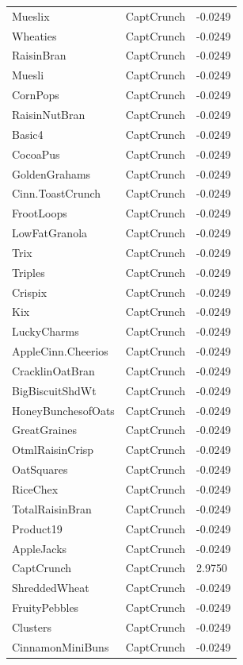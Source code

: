 \begin{table}[!htbp]
\begin{tabular}{lll}
\\
Mueslix & CaptCrunch & -0.0249
\\
Wheaties & CaptCrunch & -0.0249
\\
RaisinBran & CaptCrunch & -0.0249
\\
Muesli & CaptCrunch & -0.0249
\\
CornPops & CaptCrunch & -0.0249
\\
RaisinNutBran & CaptCrunch & -0.0249
\\
Basic4 & CaptCrunch & -0.0249
\\
CocoaPus & CaptCrunch & -0.0249
\\
GoldenGrahams & CaptCrunch & -0.0249
\\
Cinn.ToastCrunch & CaptCrunch & -0.0249
\\
FrootLoops & CaptCrunch & -0.0249
\\
LowFatGranola & CaptCrunch & -0.0249
\\
Trix & CaptCrunch & -0.0249
\\
Triples & CaptCrunch & -0.0249
\\
Crispix & CaptCrunch & -0.0249
\\
Kix & CaptCrunch & -0.0249
\\
LuckyCharms & CaptCrunch & -0.0249
\\
AppleCinn.Cheerios & CaptCrunch & -0.0249
\\
CracklinOatBran & CaptCrunch & -0.0249
\\
BigBiscuitShdWt & CaptCrunch & -0.0249
\\
HoneyBunchesofOats & CaptCrunch & -0.0249
\\
GreatGraines & CaptCrunch & -0.0249
\\
OtmlRaisinCrisp & CaptCrunch & -0.0249
\\
OatSquares & CaptCrunch & -0.0249
\\
RiceChex & CaptCrunch & -0.0249
\\
TotalRaisinBran & CaptCrunch & -0.0249
\\
Product19 & CaptCrunch & -0.0249
\\
AppleJacks & CaptCrunch & -0.0249
\\
CaptCrunch & CaptCrunch & 2.9750
\\
ShreddedWheat & CaptCrunch & -0.0249
\\
FruityPebbles & CaptCrunch & -0.0249
\\
Clusters & CaptCrunch & -0.0249
\\
CinnamonMiniBuns & CaptCrunch & -0.0249
\\

\end{tabular}
\end{table}
